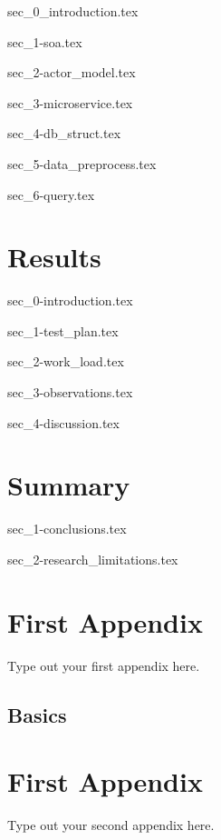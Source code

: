 \documentclass[a4paper,oneside,12pt]{report}
\newcommand{\db}[1]{\textcolor{blue!40}{#1}}
\begin{document}
{sec_0_introduction.tex}
\label{se:method_intro}

{sec_1-soa.tex}
\label{se:soa}

{sec_2-actor_model.tex}
\label{se:actor_model}

{sec_3-microservice.tex}
\label{se:microservice}

{sec_4-db_struct.tex}
\label{se:db_struct}

{sec_5-data_preprocess.tex}
\label{se:data_preprocess}

{sec_6-query.tex}
\label{se:query}

\chapter{Results}
\label{ch:results}

{sec_0-introduction.tex}
\label{se:results_intro}

{sec_1-test_plan.tex}
\label{se:test_plan}

{sec_2-work_load.tex}
\label{se:work_load}

{sec_3-observations.tex}
\label{se:observations}

{sec_4-discussion.tex}
\label{se:discussion}

\chapter{\db{Summary}}
\label{ch:conc}

{sec_1-conclusions.tex}

{sec_2-research_limitations.tex}

\appendix
\chapter{First Appendix}
Type out your first appendix here.
\section{Basics}

\chapter{First Appendix}
Type out your second appendix here.

\graphicspath{ {./images/} }

% 
% 
\printbibliography[title={References}]
\end{document}

